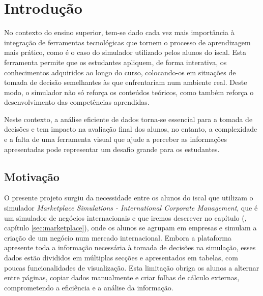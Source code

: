 

\chapter{Introdução}
\label{ch:introducao}

No contexto do ensino superior, tem-se dado cada vez mais importância à integração de ferramentas tecnológicas que tornem o processo de aprendizagem mais prático, como é o caso do simulador utilizado pelos alunos do \gls{iscal}. Esta ferramenta permite que os estudantes apliquem, de forma interativa, os conhecimentos adquiridos ao longo do curso, colocando-os em situações de tomada de decisão semelhantes às que enfrentariam num ambiente real. Deste modo, o simulador não só reforça os conteúdos teóricos, como também reforça o desenvolvimento das competências aprendidas. 

Neste contexto, a análise eficiente de dados torna-se essencial para a tomada de decisões e tem impacto na avaliação final dos alunos, no entanto, a complexidade e a falta de uma ferramenta visual que ajude a perceber as informações apresentadas pode representar um desafio grande para os estudantes.

\section{Motivação}

O presente projeto surgiu da necessidade  entre os alunos do \gls{iscal} que utilizam o simulador \textit{Marketplace Simulations - International Corporate Management}, que é um simulador de negócios internacionais e que iremos descrever no capítulo (\cf, capítulo \ref{sec:marketplace}), onde os alunos se agrupam em empresas e simulam a criação de um negócio num mercado internacional. Embora a plataforma apresente toda a informação necessária à tomada de decisões na simulação, esses dados estão divididos em múltiplas secções e apresentados em tabelas, com poucas funcionalidades de visualização. Esta limitação obriga os alunos a alternar entre páginas, copiar dados manualmente e criar folhas de cálculo externas, comprometendo a eficiência e a análise da informação.

